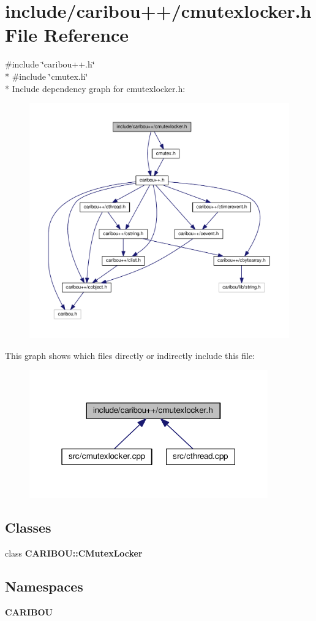 \section{include/caribou++/cmutexlocker.h File Reference}
\label{cmutexlocker_8h}
{\ttfamily \#include \char`\"{}caribou++.\-h\char`\"{}}\\*
{\ttfamily \#include \char`\"{}cmutex.\-h\char`\"{}}\\*
Include dependency graph for cmutexlocker.\-h\-:\nopagebreak
\begin{figure}[H]
\begin{center}
\leavevmode
\includegraphics[width=350pt]{cmutexlocker_8h__incl}
\end{center}
\end{figure}
This graph shows which files directly or indirectly include this file\-:\nopagebreak
\begin{figure}[H]
\begin{center}
\leavevmode
\includegraphics[width=292pt]{cmutexlocker_8h__dep__incl}
\end{center}
\end{figure}
\subsection*{Classes}
\begin{DoxyCompactItemize}
\item 
class {\bf C\-A\-R\-I\-B\-O\-U\-::\-C\-Mutex\-Locker}
\end{DoxyCompactItemize}
\subsection*{Namespaces}
\begin{DoxyCompactItemize}
\item 
{\bf C\-A\-R\-I\-B\-O\-U}
\end{DoxyCompactItemize}
